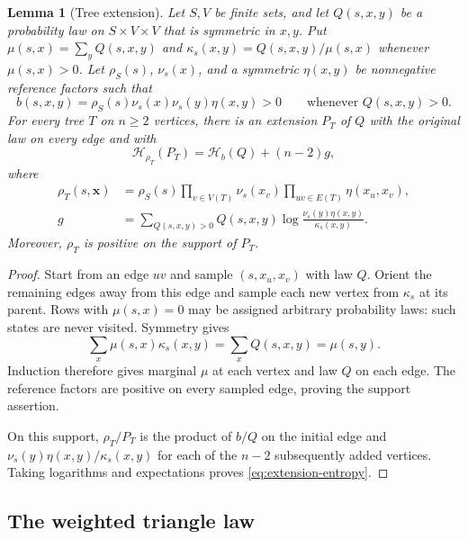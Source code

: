\documentclass[11pt,a4paper]{article}
\newtheorem{lemma}[theorem]{Lemma}
\theoremstyle{remark}
\numberwithin{equation}{section}
\begin{document}
\begin{lemma}[Tree extension]\label{lem:tree-extension}
Let $S,V$ be finite sets, and let $Q(s,x,y)$ be a probability
law on $S\times V\times V$ that is symmetric in $x,y$. Put
$\mu(s,x)=\sum_yQ(s,x,y)$ and
$\kappa_s(x,y)=Q(s,x,y)/\mu(s,x)$ whenever $\mu(s,x)>0$.
Let $\rho_S(s)$, $\nu_s(x)$, and a symmetric $\eta(x,y)$ be
nonnegative reference factors such that
\[
 b(s,x,y)=\rho_S(s)\nu_s(x)\nu_s(y)\eta(x,y)>0
 \qquad\text{whenever }Q(s,x,y)>0.
\]
For every tree $T$ on $n\geq2$ vertices, there is an extension
$P_T$ of $Q$ with the original law on every edge and with
\begin{equation}\label{eq:extension-entropy}
 \mathcal H_{\rho_T}(P_T)=\mathcal H_b(Q)+(n-2)g,
\end{equation}
where
\begin{align*}
 \rho_T(s,\mathbf x)
   &=\rho_S(s)\prod_{v\in V(T)}\nu_s(x_v)
                    \prod_{uv\in E(T)}\eta(x_u,x_v),\\
 g&=\sum_{Q(s,x,y)>0}Q(s,x,y)
                 \log\frac{\nu_s(y)\eta(x,y)}{\kappa_s(x,y)}.
\end{align*}
Moreover, $\rho_T$ is positive on the support of $P_T$.
\end{lemma}
\begin{proof}
Start from an edge $uv$ and sample $(s,x_u,x_v)$ with law $Q$.
Orient the remaining edges away from this edge and sample each
new vertex from $\kappa_s$ at its parent. Rows with
$\mu(s,x)=0$ may be assigned arbitrary probability laws: such
states are never visited. Symmetry gives
\[
 \sum_x\mu(s,x)\kappa_s(x,y)
   =\sum_xQ(s,x,y)=\mu(s,y).
\]
Induction therefore gives marginal $\mu$ at each vertex and
law $Q$ on each edge. The reference factors are positive on
every sampled edge, proving the support assertion.

On this support, $\rho_T/P_T$ is the product of $b/Q$ on the
initial edge and $\nu_s(y)\eta(x,y)/\kappa_s(x,y)$ for each of
the $n-2$ subsequently added vertices. Taking logarithms and
expectations proves \eqref{eq:extension-entropy}.
\end{proof}

\subsection{The weighted triangle law}
\end{document}
